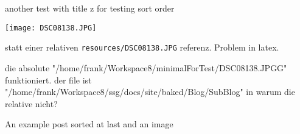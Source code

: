 \documentclass[a4paper,10pt]{scrbook}
\begin{document}
another test with title z for testing sort order

\texttt{[image: DSC08138.JPG]}

statt einer relativen \texttt{resources/DSC08138.JPG} referenz. Problem
in latex.

die absolute
"/home/frank/Workspace8/minimalForTest/DSC08138.JPGG"
funktioniert. der file ist
"/home/frank/Workspace8/ssg/docs/site/baked/Blog/SubBlog" in warum die
relative nicht?

An example post sorted at last and an image

\printindex
\end{document}
